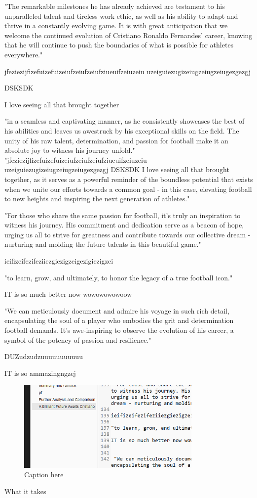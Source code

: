 \documentclass{article}
\begin{document}
 "The remarkable milestones he has already achieved are testament to his unparalleled talent and tireless work ethic, as well as his ability to adapt and thrive in a constantly evolving game. It is with great anticipation that we welcome the continued evolution of Cristiano Ronaldo Fernandes' career, knowing that he will continue to push the boundaries of what is possible for athletes everywhere."

jfeziezijfizefuizefuizeiufzeiufzeiufziueuifzeiuzeiu
uzeiguiezugizeiugzeiugzeiugezgezgj

DSKSDK

I love seeing all that brought together

"in a seamless and captivating manner, as he consistently showcases the best of his abilities and leaves us awestruck by his exceptional skills on the field. The unity of his raw talent, determination, and passion for football make it an absolute joy to witness his journey unfold." "jfeziezijfizefuizefuizeiufzeiufzeiufziueuifzeiuzeiu uzeiguiezugizeiugzeiugzeiugezgezgj DSKSDK I love seeing all that brought together, as it serves as a powerful reminder of the boundless potential that exists when we unite our efforts towards a common goal - in this case, elevating football to new heights and inspiring the next generation of athletes."

 "For those who share the same passion for football, it's truly an inspiration to witness his journey. His commitment and dedication serve as a beacon of hope, urging us all to strive for greatness and contribute towards our collective dream - nurturing and molding the future talents in this beautiful game."

ieifizeifezifeziiezgiezigzeigezigiezigzei

"to learn, grow, and ultimately, to honor the legacy of a true football icon."

IT is so much better now wowowowowoow


 "We can meticulously document and admire his voyage in such rich detail, encapsulating the soul of a player who embodies the grit and determination football demands. It's awe-inspiring to observe the evolution of his career, a symbol of the potency of passion and resilience."

DUZudzudzuuuuuuuuuuu

IT is so ammazingngzej


\begin{figure}[h!]
    \centering
    \includegraphics[width=0.8\textwidth]{figures/pf/default/default/fig1.png}
    \caption{Caption here}
    \label{fig:pf_default_1}
\end{figure}





What it takes
\end{document}
